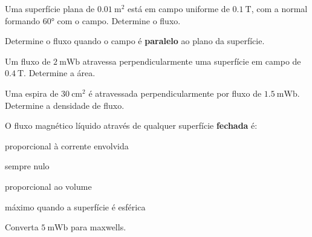 \blocofixacao
\begin{questao}[1]{}

Uma superfície plana de $\SI{0.01}{\meter\squared}$ está em campo uniforme de
$\SI{0.1}{\tesla}$, com a normal formando $\ang{60}$ com o campo. Determine o
fluxo.


\end{questao}
\begin{questao}[1]{}

Determine o fluxo quando o campo é \textbf{paralelo} ao plano da superfície.


\end{questao}
\begin{questao}[1]{}

Um fluxo de $\SI{2}{\milli\weber}$ atravessa perpendicularmente uma superfície
em campo de $\SI{0.4}{\tesla}$. Determine a área.


\end{questao}
\begin{questao}[1]{}

Uma espira de $\SI{30}{\centi\meter\squared}$ é atravessada
perpendicularmente por fluxo de $\SI{1.5}{\milli\weber}$. Determine a densidade
de fluxo.


\end{questao}
\begin{questao}[1]{}

O fluxo magnético líquido através de qualquer superfície \textbf{fechada} é:
\begin{alternativas}[2]
\item proporcional à corrente envolvida
\item sempre nulo
\item proporcional ao volume
\item máximo quando a superfície é esférica
\end{alternativas}


\end{questao}
\begin{questao}[1]{}

Converta $\SI{5}{\milli\weber}$ para maxwells.


\end{questao}

